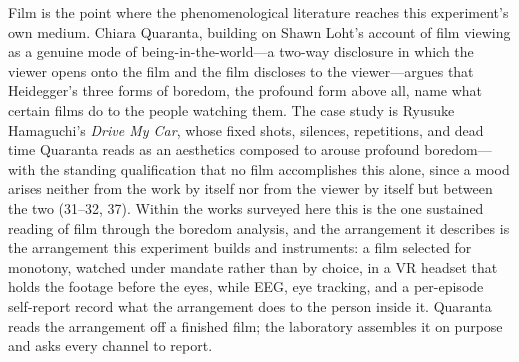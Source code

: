 Film is the point where the phenomenological literature reaches this experiment's own medium.
Chiara Quaranta, building on Shawn Loht's account of film viewing as a genuine mode of
being-in-the-world---a two-way disclosure in which the viewer opens onto the film and the
film discloses to the viewer---argues that Heidegger's three forms of boredom, the profound
form above all, name what certain films do to the people watching them. The case study is
Ryusuke Hamaguchi's \textit{Drive My Car}, whose fixed shots, silences, repetitions, and dead
time Quaranta reads as an aesthetics composed to arouse profound boredom---with the standing
qualification that no film accomplishes this alone, since a mood arises neither from the work
by itself nor from the viewer by itself but between the two (31--32, 37). Within the works
surveyed here this is the one sustained reading of film through the boredom analysis, and the
arrangement it describes is the arrangement this experiment builds and instruments: a film
selected for monotony, watched under mandate rather than by choice, in a VR headset that
holds the footage before the eyes, while EEG, eye tracking, and a per-episode self-report
record what the arrangement does to the person inside it. Quaranta reads the arrangement off
a finished film; the laboratory assembles it on purpose and asks every channel to report.

